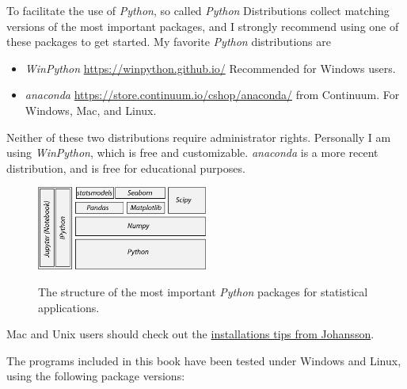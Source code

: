 To facilitate the use of \emph{Python}, so called \emph{Python} Distributions collect matching versions of the most important packages, and I strongly recommend using one of these packages to get started. My favorite \emph{Python} distributions  are

\begin{itemize}
    \item \emph{WinPython} \url{https://winpython.github.io/} Recommended for Windows users.
    \item \emph{anaconda} \url{https://store.continuum.io/cshop/anaconda/} from Continuum. For Windows, Mac, and Linux.
\end{itemize}

Neither of these two distributions require administrator rights. Personally I am using \emph{WinPython}, which is free and customizable. \emph{anaconda} is a more recent distribution, and is free for educational purposes.

\begin{figure}[h]
  \centering
  \includegraphics[width=0.5\textwidth]{../Images/ScientificPython.jpg}\\
  \caption{The structure of the most important \emph{Python} packages for statistical applications.}
  \label{fig:scientificPython}
\end{figure}

Mac and Unix users should check out the \href{https://github.com/jrjohansson/scientific-python-lectures}{installations tips from Johansson}.

The programs included in this book have been tested under Windows and Linux, using the following package versions:


